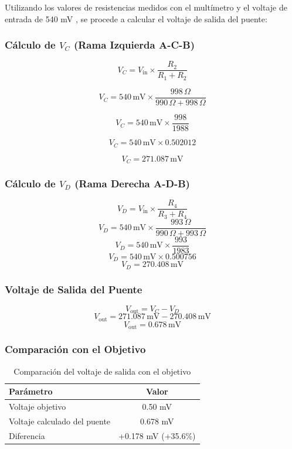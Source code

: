 \documentclass[a4paper,openany,12pt]{book}
\begin{document}
Utilizando los valores de resistencias medidos con el multímetro y el voltaje de entrada de 540 mV , se procede a calcular el voltaje de salida del puente:

\subsubsection{Cálculo de \( V_C \) (Rama Izquierda A-C-B)}

\[
V_C = V_{\text{in}} \times \frac{R_2}{R_1 + R_2}
\]

\[
V_C = 540 \, \text{mV} \times \frac{998 \, \Omega}{990 \, \Omega + 998 \, \Omega}
\]

\[
V_C = 540 \, \text{mV} \times \frac{998}{1988}
\]

\[
V_C = 540 \, \text{mV} \times 0.502012
\]

\[
V_C = 271.087 \, \text{mV}
\]
\subsubsection{Cálculo de \( V_D \) (Rama Derecha A-D-B)}

\[
V_D = V_{\text{in}} \times \frac{R_4}{R_3 + R_4}
\]
\[
V_D = 540 \, \text{mV} \times \frac{993 \, \Omega}{990 \, \Omega + 993 \, \Omega}
\]
\[
V_D = 540 \, \text{mV} \times \frac{993}{1983}
\]
\[
V_D = 540 \, \text{mV} \times 0.500756
\]
\[
V_D = 270.408 \, \text{mV}
\]

\subsubsection{Voltaje de Salida del Puente}

\[
V_{\text{out}} = V_C - V_D
\]
\[
V_{\text{out}} = 271.087 \, \text{mV} - 270.408 \, \text{mV}
\]
\[
V_{\text{out}} = 0.678 \, \text{mV}
\]

\subsubsection{Comparación con el Objetivo}

\begin{table}[h]
	\centering
	\begin{tabular}{|l|c|}
		\hline
		\textbf{Parámetro} & \textbf{Valor} \\
		\hline
		Voltaje objetivo & 0.50 mV \\
		\hline
		Voltaje calculado del puente & 0.678 mV \\
		\hline
		Diferencia & +0.178 mV (+35.6\%) \\
		\hline
		
	\end{tabular}
	\caption{Comparación del voltaje de salida con el objetivo}
	\label{tab:comparacion}
\end{table}
\end{document}
